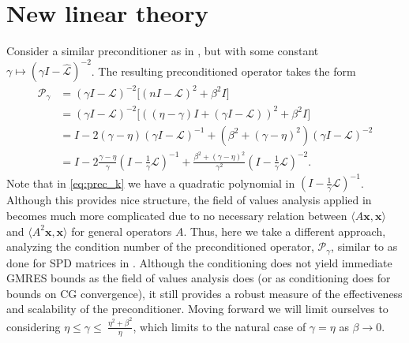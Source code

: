 \documentclass[a4paper,10pt]{article}
\begin{document}
\allowdisplaybreaks

\section{New linear theory}

Consider a similar preconditioner as in
, but with some constant $\gamma \mapsto
(\gamma I - \widehat{\mathcal{L}})^{-2}$. The resulting preconditioned
operator takes the form
%
\begin{align}\nonumber
\mathcal{P}_\gamma & =
(\gamma I - \mathcal{L})^{-2}\Big[(nI - \mathcal{L})^2 + \beta^2 I\Big] \\ \nonumber
& = (\gamma I - \mathcal{L})^{-2}\Big[((\eta-\gamma)I + (\gamma I - \mathcal{L}))^2 + \beta^2 I\Big] \\
& = I - 2(\gamma-\eta)(\gamma I - \mathcal{L})^{-1} + (\beta^2 + (\gamma-\eta)^2)(\gamma I -
	\mathcal{L})^{-2} \nonumber\\
& = I - 2\frac{\gamma-\eta}{\gamma}\left(I - \tfrac{1}{\gamma}\mathcal{L}\right)^{-1} +
	\frac{\beta^2 + (\gamma-\eta)^2}{\gamma^2}
	\left(I - \tfrac{1}{\gamma}\mathcal{L}\right)^{-2}.\label{eq:prec_k}
\end{align}
%
Note that in \eqref{eq:prec_k} we have a quadratic polynomial in
$(I - \tfrac{1}{\gamma}\mathcal{L})^{-1}$. Although this provides
nice structure, the field of values analysis applied in 
becomes much more complicated due to no necessary relation between
$\langle A\mathbf{x},\mathbf{x}\rangle$ and
$\langle A^2\mathbf{x},\mathbf{x}\rangle$ for general operators $A$. Thus, here
we take a different approach, analyzing the condition number of the preconditioned
operator, $\mathcal{P}_\gamma$, similar to as done for SPD matrices in \cite{exh}.
Although the conditioning does not yield immediate GMRES bounds as the field of values
analysis does (or as conditioning does for bounds on CG convergence), it still
provides a robust measure of the effectiveness and scalability of the
preconditioner.
Moving forward we will limit ourselves to considering $\eta \leq \gamma \leq \
\tfrac{\eta^2+\beta^2}{\eta}$, which limits to the natural case of $\gamma = \eta$
as $\beta \to 0$.
\end{document}
